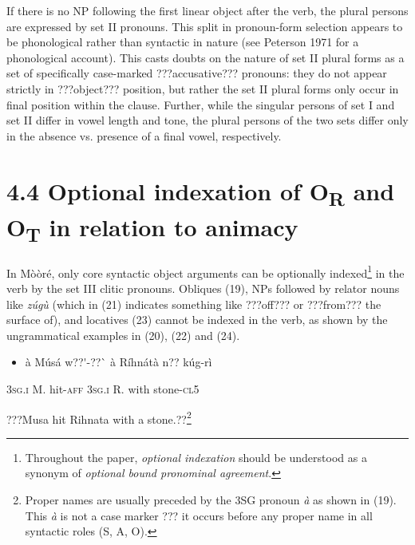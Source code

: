 \documentclass[output=paper]{langsci/langscibook}
\begin{document}
{{If there is no NP following the first linear object after the verb, the plural persons are expressed by set II pronouns. This split in pronoun-form selection appears to be phonological rather than syntactic in nature (see Peterson 1971 for a phonological account). This casts doubts on the nature of set II plural forms as a set of specifically case-marked ???accusative??? pronouns: they do not appear strictly in ???object??? position, but rather the set II plural forms only occur in final position within the clause. Further, while the singular persons of set I and set II differ in vowel length and tone, the plural persons of the two sets differ only in the absence vs. presence of a final vowel, respectively. 

\section{4.4 Optional indexation of O\textsubscript{R} and O\textsubscript{T} in relation to animacy}

In M\`{o}\`{o}r\'{e}, only core syntactic object arguments can be optionally indexed\footnote{ Throughout the paper, \textit{optional indexation} should be understood as a synonym of \textit{optional bound pronominal agreement}. }{ }in the verb by the set III clitic pronouns. Obliques (19), NPs followed by relator nouns like \emph{z\'{u}g\`{u}} (which in (21) indicates something like ???off??? or ???from??? the surface of), and locatives (23) cannot be indexed in the verb, as shown by the ungrammatical examples in (20), (22) and (24). 

\begin{itemize}
\item \begin{styleNumberedEX}
\label{bkm:Ref424201679}\`{a}    M\'{u}s\'{a}    w??\'{ }-??\`{ }    \`{a}    R\'{i}hn\'{a}t\`{a}  n??  k\'{u}g-r\`{i}
\end{styleNumberedEX}\end{itemize}
\begin{styleGloss}
\textsc{3sg.i  }  M.    hit-\textsc{aff  3sg.i  }  R.    with  stone-\textsc{cl5}
\end{styleGloss}

\begin{styleTranslation}
???Musa hit Rihnata with a stone.??\footnote{ Proper names are usually preceded by the 3SG pronoun\textit{ \`{a}} as shown in (19). This \textit{\`{a}} is not a case marker ??? it occurs before any proper name in all syntactic roles (S, A, O).}
\end{styleTranslation}

}}
\end{document}
